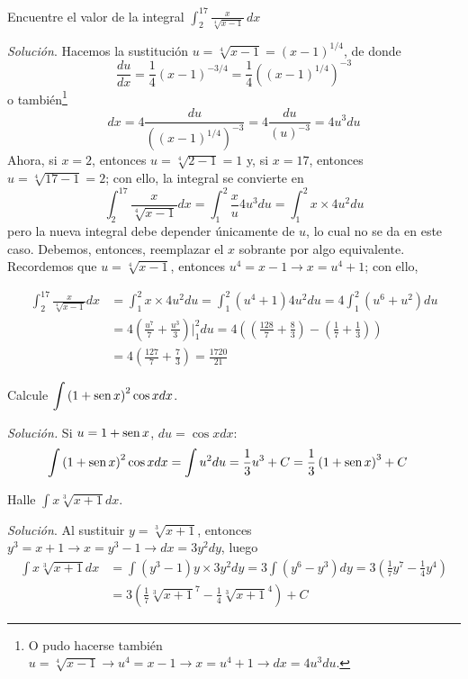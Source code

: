 \begin{ejemplo}
\textnormal{Encuentre el valor de la integral} $\displaystyle{\int_{2}^{17}\frac{x}{\sqrt[4]{x-1}}\,dx}$
\end{ejemplo}

\textit{Solución}. Hacemos la sustitución $u=\sqrt[4]{x-1}=(x-1)^{1/4}$, de donde
\[
\frac{du}{dx}=\frac{1}{4}(x-1)^{-3/4}=\frac{1}{4}\left((x-1)^{1/4}\right)^{-3}
\]
o también\footnote{O pudo hacerse también $u=\sqrt[4]{x-1}\rightarrow u^{4}=x-1\rightarrow x=u^{4}+1\rightarrow dx=4u^{3}du.$}
\[
dx=4\frac{du}{\left((x-1)^{1/4}\right)^{-3}}=4\frac{du}{\left(u\right)^{-3}}=4 u^3du
\]
Ahora, si $x=2$, entonces $u=\sqrt[4]{2-1}=1$ y, si $x=17$, entonces $u=\sqrt[4]{17-1}=2$; con ello, la integral se convierte en
\[
\int_{2}^{17}\frac{x}{\sqrt[4]{x-1}}dx=\int_{1}^{2}\frac{x}{u}4u^{3}du=\int_{1}^{2}x\times 4u^{2}du
\]
pero la nueva integral debe depender únicamente de $u$, lo cual no se da en este caso. Debemos, entonces, reemplazar el $x$ sobrante por algo equivalente. Recordemos que $u=\sqrt[4]{x-1}$, entonces $u^{4}=x-1\rightarrow x=u^{4}+1$; con ello,

{\small
\begin{align*}
\int_{2}^{17}\frac{x}{\sqrt[4]{x-1}}dx&=\int_{1}^{2}x\times 4u^{2}du=\int_{1}^{2}\left( u^{4}+1\right)4u^{2}du=4\int_{1}^{2}\left( u^{6}+u^{2}\right) du\\
&=4\left( \frac{u^{7}}{7}+\frac{u^{3}}{3}\right)\Big\vert_{1}^{2}du=4\left( \left(
\frac{128}{7}+\frac{8}{3}\right) -\left( \frac{1}{7}+\frac{1}{3}\right)
\right)\\
&=4\left( \frac{127}{7}+\frac{7}{3}\right) =\frac{1720}{21} 
\end{align*}
}


\begin{ejemplo}
Calcule $\displaystyle{\int \left( 1+\text{\rm sen}\,x\right) ^{2}\cos xdx}$.
\end{ejemplo}


\textit{Solución.} Si $u=1+\text{\rm sen}\, x$, $du=\cos xdx$:
{\small
\begin{align*}
\int \left( 1+\text{\rm sen}\, x\right)^{2}\cos xdx
&=\int u^{2}du=\frac{1}{3}u^{3}+C=\frac{1}{3}\left( 1+\text{\rm sen}\, x\right) ^{3}+C
\end{align*}
}
\clearpage

\begin{ejemplo}
\textnormal{Halle} $\displaystyle{\int x\sqrt[3]{x+1}dx}$.
\end{ejemplo}

\textit{Solución}. Al sustituir $y=\sqrt[3]{x+1}$, entonces $y^{3}=x+1\rightarrow x=y^{3}-1\rightarrow dx=3y^{2}dy$, luego
{\small
\begin{align*}
\int x\sqrt[3]{x+1}dx&=\int \left( y^{3}-1\right) y \times 3y^{2}dy=3\int \left(
y^{6}-y^{3}\right) dy=3\left( \frac{1}{7}y^{7}-\frac{1}{4}y^{4}\right)\\
&=3\left( \frac{1}{7}\sqrt[3]{x+1}^{7}-\frac{1}{4}\sqrt[3]{x+1}^{4}\right) +C
\end{align*}
}

